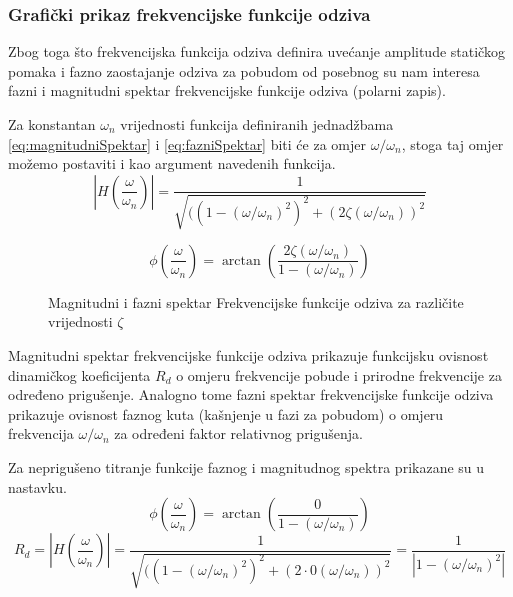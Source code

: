 \subsubsection{Grafički prikaz frekvencijske funkcije odziva}
Zbog toga što frekvencijska funkcija odziva definira uvećanje amplitude statičkog
pomaka i fazno zaostajanje odziva za pobudom od posebnog su nam interesa fazni i
magnitudni spektar frekvencijske funkcije odziva (polarni zapis).
\par

Za konstantan $\omega_n$ vrijednosti funkcija definiranih jednadžbama 
\eqref{eq:magnitudniSpektar} i \eqref{eq:fazniSpektar} biti će za omjer
$\omega/\omega_n$, stoga taj omjer možemo postaviti i kao argument navedenih
funkcija. 
\begin{equation}\label{eq:magnitudniSpektarZaOmjer}
    \left|H\left(\frac{\omega}{\omega_n}\right)\right|=
        \frac{1}{\sqrt{((1-(\omega/\omega_n)^2)^2+(2\zeta(\omega/\omega_n))^2}}
\end{equation}

\begin{equation}\label{eq:fazniSpektarZaOmjer}
    \phi\left(\frac{\omega}{\omega_n}\right)=
        \arctan\left(\frac{2\zeta(\omega/\omega_n)}{1-(\omega/\omega_n)}\right)
\end{equation}

\begin{figure}[H]
    \begin{subfigure}{1\textwidth}
        
    \end{subfigure}
    \vfill
    \begin{subfigure}{1\textwidth}
        
    \end{subfigure}
    \caption{Magnitudni i fazni spektar Frekvencijske funkcije odziva za različite vrijednosti $\zeta$}
    \label{fig:frf-priguseno}
\end{figure}

Magnitudni spektar frekvencijske funkcije odziva prikazuje funkcijsku ovisnost
dinamičkog koeficijenta $R_d$ o omjeru frekvencije pobude i prirodne frekvencije za
određeno prigušenje. Analogno tome fazni spektar frekvencijske funkcije odziva
prikazuje ovisnost faznog kuta (kašnjenje u fazi za pobudom) o omjeru frekvencija 
$\omega/\omega_n$ za određeni faktor relativnog prigušenja.
\par

Za neprigušeno titranje funkcije faznog i magnitudnog spektra prikazane su u
nastavku.
\begin{equation}\label{eq:fazniSpektarNepriguseno}
    \phi\left(\frac{\omega}{\omega_n}\right)=
        \arctan\left(\frac{0}{1-(\omega/\omega_n)}\right)
\end{equation}
\begin{equation}\label{eq:magnitudniSpektarNepriguseno}
    R_d=\left|H\left(\frac{\omega}{\omega_n}\right)\right|=
        \frac{1}{\sqrt{((1-(\omega/\omega_n)^2)^2+(2\cdot 0(\omega/\omega_n))^2}} =
        \frac{1}{|1-(\omega/\omega_n)^2|}
\end{equation}
\newpage

